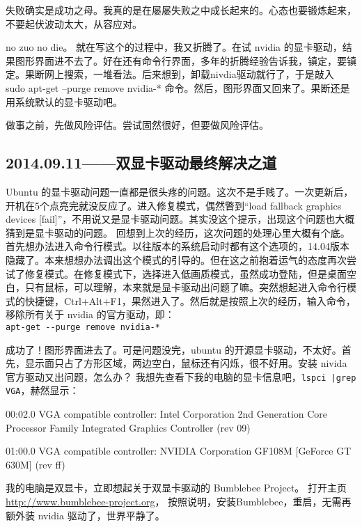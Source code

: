 \documentclass[cn,11pt,chinese,twoside]{elegantbook}
\begin{document}
失败确实是成功之母。我真的是在屡屡失败之中成长起来的。心态也要锻炼起来，不要起伏波动太大，从容应对。

no zuo no die。 就在写这个的过程中，我又折腾了。在试 nvidia 的显卡驱动，结果图形界面进不去了。好在还有命令行界面，多年的折腾经验告诉我，镇定，要镇定。果断网上搜索，一堆看法。后来想到，卸载nivdia驱动就行了，于是敲入
sudo apt-get --purge remove nvidia-*
 命令。然后，图形界面又回来了。果断还是用系统默认的显卡驱动吧。

做事之前，先做风险评估。尝试固然很好，但要做风险评估。



\subsection*{2014.09.11——双显卡驱动最终解决之道}
Ubuntu 的显卡驱动问题一直都是很头疼的问题。这次不是手贱了。一次更新后，开机在5个点亮完就没反应了。进入修复模式，偶然瞥到“load fallback graphics devices [fail]”，不用说又是显卡驱动问题。其实没这个提示，出现这个问题也大概猜到是显卡驱动的问题。 回想到上次的经历，这次问题的处理心里大概有个底。首先想办法进入命令行模式。以往版本的系统启动时都有这个选项的，14.04版本隐藏了。本来想想办法调出这个模式的引导的。但在这之前抱着运气的态度再次尝试了修复模式。在修复模式下，选择进入低画质模式，虽然成功登陆，但是桌面空白，只有鼠标，可以理解，本来就是显卡驱动出问题了嘛。突然想起进入命令行模式的快捷键，Ctrl+Alt+F1，果然进入了。然后就是按照上次的经历，输入命令，移除所有关于 nvidia 的官方驱动，即：\\
\verb|apt-get --purge remove nvidia-*|

成功了！图形界面进去了。可是问题没完，ubuntu 的开源显卡驱动，不太好。首先，显示面只占了方形区域，两边空白，鼠标还有闪烁，很不好用。安装 nivida 官方驱动又出问题，怎么办？ 我想先查看下我的电脑的显卡信息吧，\verb[lspci |grep VGA[，赫然显示：

00:02.0 VGA compatible controller: Intel Corporation 2nd Generation Core Processor Family Integrated Graphics Controller (rev 09)

01:00.0 VGA compatible controller: NVIDIA Corporation GF108M [GeForce GT 630M] (rev ff)

我的电脑是双显卡，立即想起关于双显卡驱动的 Bumblebee Project。 打开主页 \url{http://www.bumblebee-project.org}， 按照说明，安装Bumblebee，重启，无需再额外装 nvidia 驱动了，世界平静了。

\end{document}
